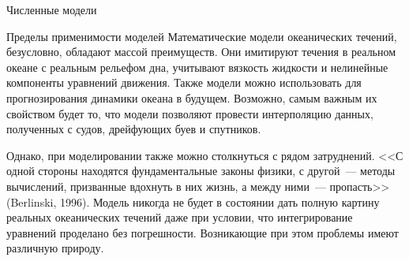 \begin{chapter}{Численные модели}
\begin{section}{Пределы применимости моделей}
%
Математические модели океанических течений, безусловно, обладают массой
преимуществ. Они имитируют течения в реальном океане с реальным
рельефом дна, учитывают вязкость жидкости и нелинейные компоненты уравнений
движения. Также модели можно использовать для прогнозирования динамики
океана в будущем. Возможно, самым важным их свойством будет то, что модели 
позволяют провести интерполяцию данных, полученных с судов, дрейфующих
буев и спутников.
%

Однако, при моделировании также можно столкнуться с рядом затруднений. 
<<С одной стороны находятся фундаментальные законы физики, с другой~---
методы вычислений, призванные вдохнуть в них жизнь, а между ними~---
пропасть>> (Berlinski, 1996). Модель никогда не будет
в состоянии дать полную картину реальных океанических течений даже при
условии, что интегрирование уравнений проделано без погрешности. Возникающие
при этом проблемы имеют различную природу.
%


\end{section}
\end{chapter}
